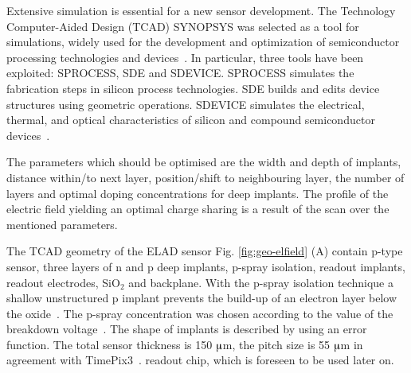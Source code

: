 
Extensive simulation is essential for a new sensor development. 
The  Technology Computer-Aided Design (TCAD) SYNOPSYS was selected  as a tool for simulations, widely used for the development and optimization of semiconductor processing technologies and devices~\cite{Synopsys}. 
In particular, three tools have been exploited: SPROCESS, SDE and SDEVICE. 
SPROCESS simulates the fabrication steps in silicon process technologies. 
SDE builds and edits device structures using geometric operations. 
SDEVICE simulates the electrical, thermal, and optical characteristics of silicon and compound semiconductor devices~\cite{SynopsysIncG-2012.06}.

The parameters which should be optimised are the width and depth of implants, distance within/to next layer, position/shift to neighbouring layer,
 the number of layers and optimal doping concentrations for deep implants.
The profile of the electric field yielding an optimal charge sharing is a result of the scan over the mentioned parameters. 

The TCAD geometry of the ELAD sensor Fig. \ref{fig:geo-elfield} (A) contain p-type sensor, three layers of n and p deep implants, p-spray isolation, readout implants, readout electrodes, SiO${}_2$ and backplane. 
With the p-spray isolation technique a shallow unstructured p implant prevents the build-up of an electron layer below the oxide~\cite{Lutz}. 
The p-spray concentration was chosen according to the value of the breakdown voltage~\cite{Pellegrini}. 
The shape of implants is described by using an error function. 
The total sensor thickness is 150 $\muup$m, the pitch size is 55 $\muup$m in agreement with TimePix3~\cite{TimePix}. readout chip, which is foreseen to be used later on. 

